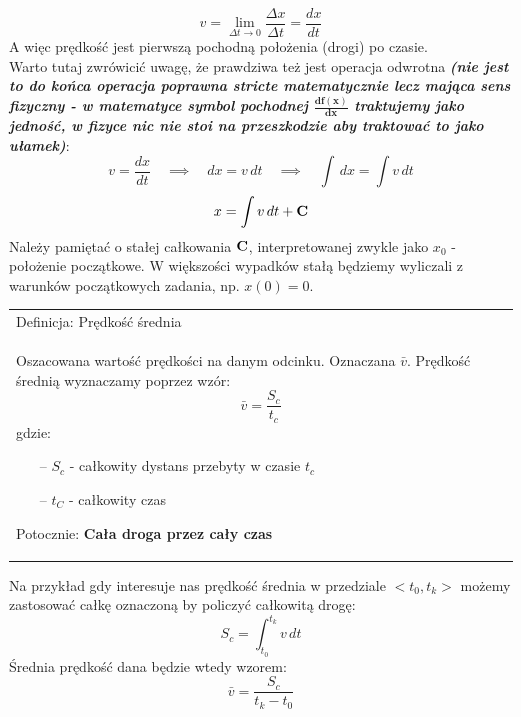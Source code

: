 \documentclass[a4paper]{article}
\newenvironment{definition}[1][title]
    {
        \begin{center}
        \begin{tabular}{|p{1\textwidth}|}
        \hline
            Definicja: #1\\[2ex]
        \begin{em}
        \Large
    }
    { 
        \end{em}
        \\\hline
        \end{tabular} 
        \end{center}
    }
\begin{document}
        \[v = \lim_{\Delta t \rightarrow 0}{\frac{\Delta x}{\Delta t}} = \frac{dx}{dt}\]
        A więc prędkość jest pierwszą pochodną położenia (drogi) po czasie.\\
        Warto tutaj zwrówicić uwagę, że prawdziwa też jest operacja odwrotna \textit{\textbf{(nie jest to do końca 
        operacja poprawna stricte matematycznie lecz mająca sens fizyczny - w matematyce symbol pochodnej
        $\mathbf{\frac{d f(x)}{dx}}$ traktujemy jako jedność, w fizyce nic nie stoi na przeszkodzie aby traktować to jako ułamek)}}:
        \[v = \frac{dx}{dt}  \quad  \implies \quad dx = v\,dt \quad  \implies \quad \int\,dx = \int v\,dt\]
        \[x = \int v\,dt + \bold{C}\]
        Należy pamiętać o stałej całkowania $\bold{C}$, interpretowanej zwykle jako $x_0$ - położenie początkowe. W większości
        wypadków stałą będziemy wyliczali z warunków początkowych zadania, np. $\mathit{x(0) = 0}$. 

        \begin{definition}[Prędkość średnia]
            Oszacowana wartość prędkości na danym odcinku. Oznaczana $\bar{v}$. Prędkość średnią wyznaczamy poprzez wzór:
            \[\bar{v} = \frac{S_c}{t_c}\]
            gdzie:
            \begin{itemize}
                \item[--] $S_c$ - całkowity dystans przebyty w czasie $t_c$
                \item[--] $t_C$ - całkowity czas
            \end{itemize}
            Potocznie: \textbf{Cała droga przez cały czas}
        \end{definition}
        Na przykład gdy interesuje nas prędkość średnia w przedziale $<t_0, t_k>$ możemy zastosować całkę oznaczoną by policzyć
        całkowitą drogę:
        \[S_c = \int_{t_0}^{t_k} v\,dt\]
        Średnia prędkość dana będzie wtedy wzorem:
        \[\bar{v} = \frac{S_c}{t_k - t_0}\]
    \pagebreak
\end{document}
